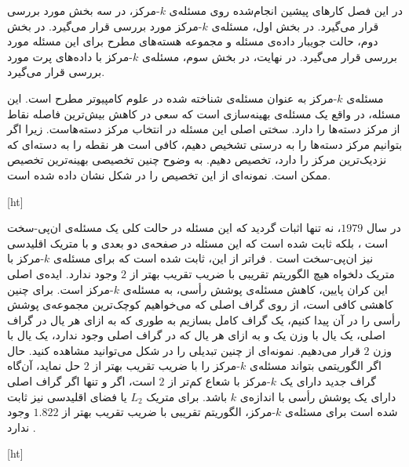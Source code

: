 

در این فصل کارهای پیشین انجام‌شده روی مسئله‌ی $k$-مرکز، در سه بخش مورد بررسی قرار می‌گیرد. در بخش اول، مسئله‌ی $k$-مرکز مورد بررسی قرار می‌گیرد. در بخش دوم، حالت جویبار داده‌ی مسئله و مجموعه هسته‌های مطرح برای این مسئله مورد بررسی قرار می‌گیرد. در نهایت، در بخش سوم، مسئله‌ی $k$-مرکز‌ با داده‌های پرت مورد بررسی قرار می‌گیرد.


مسئله‌ی $k$-مرکز‌ به عنوان مسئله‌ی شناخته شده در علوم کامپیوتر مطرح است. این مسئله، در واقع یک مسئله‌ی بهینه‌سازی است که سعی در کاهش بیش‌ترین فاصله نقاط از مرکز دسته‌ها را دارد. سختی اصلی این مسئله در انتخاب مرکز دسته‌هاست. زیرا اگر بتوانیم مرکز دسته‌ها را به درستی تشخیص دهیم، کافی است هر نقطه را به دسته‌ای که نزدیک‌ترین مرکز  را دارد، تخصیص دهیم. به وضوح چنین تخصیصی بهینه‌ترین تخصیص ممکن است. نمونه‌ای از این تخصیص را در شکل  نشان داده شده است.

[ht]

در سال $1979$، نه تنها اثبات گردید که این مسئله در حالت کلی یک مسئله‌ی ان‌پی-سخت است ، بلکه ثابت شده است که این مسئله در صفحه‌ی دو بعدی و با متریک اقلیدسی نیز‌ ان‌پی-سخت است . فراتر از این، ثابت شده است که برای مسئله‌ی $k$-مرکز  با متریک دلخواه هیچ الگوریتم تقریبی با ضریب تقریب بهتر از $2$ وجود ندارد. ایده‌ی اصلی این کران پایین، کاهش مسئله‌ی پوشش‌ رأسی، به مسئله‌ی $k$-مرکز است. برای چنین کاهشی کافی است، از روی گراف اصلی که می‌خواهیم کوچک‌ترین مجموعه‌ی پوشش‌ رأسی را در آن پیدا کنیم، یک گراف کامل بسازیم به طوری که به ازای هر یال در گراف اصلی، یک یال با وزن یک و به ازای هر یال که در گراف اصلی وجود ندارد، یک یال با وزن $2$ قرار می‌دهیم. نمونه‌ای از چنین تبدیلی را در شکل  می‌توانید مشاهده کنید. حال اگر الگوریتمی بتواند مسئله‌ی $k$-مرکز را با ضریب تقریب بهتر از $2$ حل نماید، آن‌گاه گراف جدید دارای یک $k$-مرکز با شعاع کم‌تر از $2$ است، اگر و تنها اگر گراف اصلی دارای یک پوشش‌ رأسی با اندازه‌ی $k$ باشد. برای متریک $L_2$ یا فضای اقلیدسی نیز‌‌ ثابت شده است برای مسئله‌ی $k$-مرکز، الگوریتم تقریبی با ضریب تقریب بهتر از $1.822$ وجود ندارد .

[ht]

